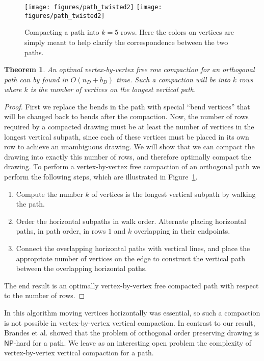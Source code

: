 \documentclass[12pt]{article}
\newtheorem{theorem}{Theorem}
\theoremstyle{definitions}
\newcommand{\NP}{\mathsf{NP}}
\begin{document}
\begin{figure}[ht]
\centering
\ifFull
\texttt{[image: figures/path\_twisted2]}
\else
\texttt{[image: figures/path\_twisted2]}
\fi
\caption{Compacting a path into $k = 5$ rows. 
Here the colors on vertices are simply meant to help
clarify the correspondence between the two paths.}
\label{fig:path-untwist}
\end{figure}

\begin{theorem}
An optimal vertex-by-vertex free row compaction for an orthogonal path can by found in $O(n_D+b_D)$ time. Such a compaction will be into $k$ rows where $k$ is the number of vertices on the longest vertical path.
\end{theorem}
\newpage
\begin{proof}
First we replace the bends in the path with special ``bend vertices'' that will be changed back to bends after the compaction.
Now, the number of rows required by a compacted drawing must be at least
the number of vertices in the longest vertical subpath, since each of these
vertices must be placed in its own row to achieve an unambiguous drawing. We
will show that we can compact the drawing into exactly this number of rows, and therefore optimally compact the drawing.
To perform a vertex-by-vertex free compaction of an orthogonal path we perform the
following steps, which are illustrated in Figure~\ref{fig:path-untwist}.
\begin{enumerate}
\item
Compute the number $k$ of vertices is the longest vertical subpath by walking the path.
\item
Order the horizontal subpaths in walk order. Alternate placing horizontal paths, in path order, in rows $1$ and $k$ overlapping in their endpoints.
\item
Connect the overlapping horizontal paths with vertical lines, and place the appropriate   number of vertices on the edge to construct the vertical path between the overlapping horizontal paths.
\end{enumerate}
The end result is an optimally vertex-by-vertex free compacted path with respect to the number of rows.
\end{proof}

In this algorithm moving vertices horizontally was essential, so such a compaction is not possible in vertex-by-vertex vertical compaction. In contrast to our result, Brandes et al. showed that the problem of orthogonal order preserving drawing is $\NP$-hard for a path\cite{Brandes-Ortho}. We leave as an interesting open problem the complexity of vertex-by-vertex vertical compaction for a path.
\end{document}
